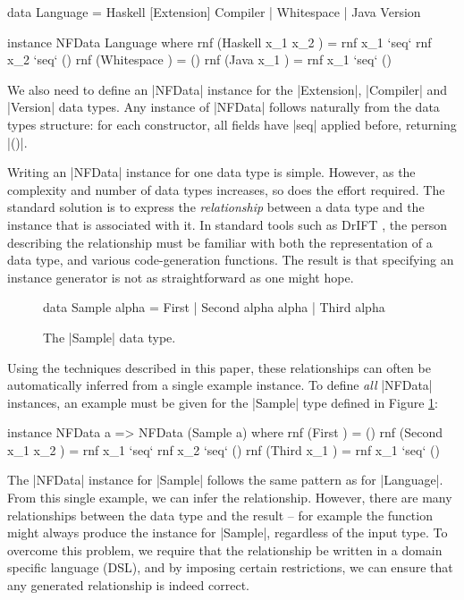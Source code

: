 \documentclass[preprint]{sigplanconf}
\begin{document}
\begin{code}
data Language  =  Haskell [Extension] Compiler
               |  Whitespace
               |  Java Version

instance NFData Language where
    rnf (Haskell x_1 x_2  ) = rnf x_1 `seq` rnf x_2 `seq` ()
    rnf (Whitespace       ) = ()
    rnf (Java x_1         ) = rnf x_1 `seq` ()
\end{code}

We also need to define an |NFData| instance for the |Extension|, |Compiler| and |Version| data types. Any instance of |NFData| follows naturally from the data types structure: for each constructor, all fields have |seq| applied before, returning |()|.

Writing an |NFData| instance for one data type is simple. However, as the complexity and number of data types increases, so does the effort required. The standard solution is to express the \textit{relationship} between a data type and the instance that is associated with it. In standard tools such as DrIFT \cite{drift}, the person describing the relationship must be familiar with both the representation of a data type, and various code-generation functions. The result is that specifying an instance generator is not as straightforward as one might hope.

\begin{figure}
\begin{code}
data Sample alpha  =  First
                   |  Second  alpha alpha
                   |  Third   alpha
\end{code}
\caption{The |Sample| data type.}
\label{fig:sample}
\end{figure}

Using the techniques described in this paper, these relationships can often be automatically inferred from a single example instance. To define \textit{all} |NFData| instances, an example must be given for the |Sample| type defined in Figure \ref{fig:sample}:

\begin{code}
instance NFData a => NFData (Sample a) where
    rnf (First           ) = ()
    rnf (Second x_1 x_2  ) = rnf x_1 `seq` rnf x_2 `seq` ()
    rnf (Third x_1       ) = rnf x_1 `seq` ()
\end{code}

The |NFData| instance for |Sample| follows the same pattern as for |Language|. From this single example, we can infer the relationship. However, there are many relationships between the data type and the result -- for example the function might always produce the instance for |Sample|, regardless of the input type. To overcome this problem, we require that the relationship be written in a domain specific language (DSL), and by imposing certain restrictions, we can ensure that any generated relationship is indeed correct.
\end{document}
